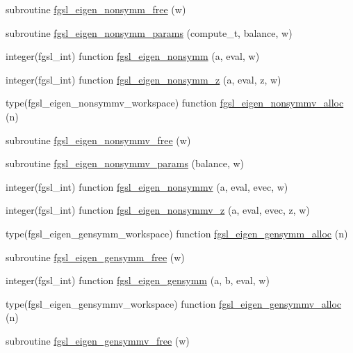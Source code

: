 \begin{DoxyCompactItemize}
\item 
subroutine \hyperlink{eigen_8finc_a4c13d8c917420938df8375af8909183f}{fgsl\+\_\+eigen\+\_\+nonsymm\+\_\+free} (w)
\item 
subroutine \hyperlink{eigen_8finc_aa9c147deaa41d2f07a8af9dde8abf35f}{fgsl\+\_\+eigen\+\_\+nonsymm\+\_\+params} (compute\+\_\+t, balance, w)
\item 
integer(fgsl\+\_\+int) function \hyperlink{eigen_8finc_a5044ee7ae8200fc994b55c7cd4f047d7}{fgsl\+\_\+eigen\+\_\+nonsymm} (a, eval, w)
\item 
integer(fgsl\+\_\+int) function \hyperlink{eigen_8finc_ae3e1cd3e7d0f3abd38f98a5f911d6889}{fgsl\+\_\+eigen\+\_\+nonsymm\+\_\+z} (a, eval, z, w)
\item 
type(fgsl\+\_\+eigen\+\_\+nonsymmv\+\_\+workspace) function \hyperlink{eigen_8finc_af6b786903112c4f4139bee94120feea4}{fgsl\+\_\+eigen\+\_\+nonsymmv\+\_\+alloc} (n)
\item 
subroutine \hyperlink{eigen_8finc_a4684734bff6c27f739aeb31d3b090bee}{fgsl\+\_\+eigen\+\_\+nonsymmv\+\_\+free} (w)
\item 
subroutine \hyperlink{eigen_8finc_ae6a1d284903b7387319d8636df94a679}{fgsl\+\_\+eigen\+\_\+nonsymmv\+\_\+params} (balance, w)
\item 
integer(fgsl\+\_\+int) function \hyperlink{eigen_8finc_aa09384a54b214602b298c94bc07d3c58}{fgsl\+\_\+eigen\+\_\+nonsymmv} (a, eval, evec, w)
\item 
integer(fgsl\+\_\+int) function \hyperlink{eigen_8finc_ad466997b5f8528265070f2aba003ddab}{fgsl\+\_\+eigen\+\_\+nonsymmv\+\_\+z} (a, eval, evec, z, w)
\item 
type(fgsl\+\_\+eigen\+\_\+gensymm\+\_\+workspace) function \hyperlink{eigen_8finc_a087cf013d99c79e7f2670c0e6035260b}{fgsl\+\_\+eigen\+\_\+gensymm\+\_\+alloc} (n)
\item 
subroutine \hyperlink{eigen_8finc_a6896d5bb5a13213ea85bb1c89bd77109}{fgsl\+\_\+eigen\+\_\+gensymm\+\_\+free} (w)
\item 
integer(fgsl\+\_\+int) function \hyperlink{eigen_8finc_ab6358ebdfcf35887b7fdabc3588d4818}{fgsl\+\_\+eigen\+\_\+gensymm} (a, b, eval, w)
\item 
type(fgsl\+\_\+eigen\+\_\+gensymmv\+\_\+workspace) function \hyperlink{eigen_8finc_aaf9f9b1f18094f6300da921900b946fa}{fgsl\+\_\+eigen\+\_\+gensymmv\+\_\+alloc} (n)
\item 
subroutine \hyperlink{eigen_8finc_ad60f54bc4c9afe52b1643a53ac4debf0}{fgsl\+\_\+eigen\+\_\+gensymmv\+\_\+free} (w)
\item 

\end{DoxyCompactItemize}

